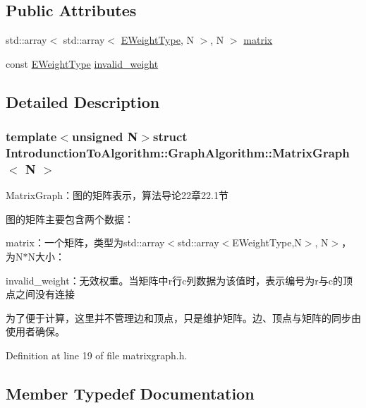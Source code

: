 \subsection*{Public Attributes}
\begin{DoxyCompactItemize}
\item 
std\+::array$<$ std\+::array$<$ \hyperlink{struct_introdunction_to_algorithm_1_1_graph_algorithm_1_1_matrix_graph_af2d243f2c1bb8a101aa3f71f469c64e8}{E\+Weight\+Type}, N $>$, N $>$ \hyperlink{struct_introdunction_to_algorithm_1_1_graph_algorithm_1_1_matrix_graph_a7808a578d4c380baa6de5d4b23bcc84f}{matrix}
\item 
const \hyperlink{struct_introdunction_to_algorithm_1_1_graph_algorithm_1_1_matrix_graph_af2d243f2c1bb8a101aa3f71f469c64e8}{E\+Weight\+Type} \hyperlink{struct_introdunction_to_algorithm_1_1_graph_algorithm_1_1_matrix_graph_a015ceb5dcacd9d1bc1e67e5cf331aa7f}{invalid\+\_\+weight}
\end{DoxyCompactItemize}


\subsection{Detailed Description}
\subsubsection*{template$<$unsigned N$>$struct Introdunction\+To\+Algorithm\+::\+Graph\+Algorithm\+::\+Matrix\+Graph$<$ N $>$}

Matrix\+Graph：图的矩阵表示，算法导论22章22.1节 

图的矩阵主要包含两个数据：


\begin{DoxyItemize}
\item {\ttfamily matrix}：一个矩阵，类型为{\ttfamily std\+::array$<$std\+::array$<$E\+Weight\+Type,N$>$, N$>$}，为{\ttfamily N$\ast$\+N}大小：
\item {\ttfamily invalid\+\_\+weight}：无效权重。当矩阵中{\ttfamily r}行{\ttfamily c}列数据为该值时，表示编号为{\ttfamily r}与{\ttfamily c}的顶点之间没有连接
\end{DoxyItemize}

为了便于计算，这里并不管理边和顶点，只是维护矩阵。边、顶点与矩阵的同步由使用者确保。 

Definition at line 19 of file matrixgraph.\+h.



\subsection{Member Typedef Documentation}
\hypertarget{struct_introdunction_to_algorithm_1_1_graph_algorithm_1_1_matrix_graph_a73af3fee951b91b4f5c48422460f8c03}{}
